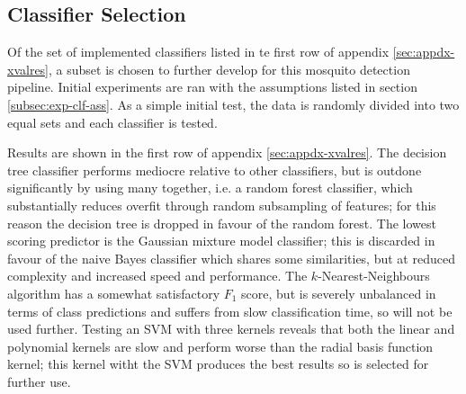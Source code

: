       
     
    \subsection{Classifier Selection}
    \label{subsec:exp-clf-select}
        Of the set of implemented classifiers listed in te first row of appendix \ref{sec:appdx-xvalres}, a subset is chosen to further develop for this mosquito detection pipeline. Initial experiments are ran with the assumptions listed in section \ref{subsec:exp-clf-ass}. As a simple initial test, the data is randomly divided into two equal sets and each classifier is tested.
        
        Results are shown in the first row of appendix \ref{sec:appdx-xvalres}. The decision tree classifier performs mediocre relative to other classifiers, but is outdone significantly by using many together, i.e. a random forest classifier, which substantially reduces overfit through random subsampling of features; for this reason the decision tree is dropped in favour of the random forest. The lowest scoring predictor is the Gaussian mixture model classifier; this is discarded in favour of the naive Bayes classifier which shares some similarities, but at reduced complexity and increased speed and performance. The $k$-Nearest-Neighbours algorithm has a somewhat satisfactory $F_1$ score, but is severely unbalanced in terms of class predictions and suffers from slow classification time, so will not be used further. Testing an SVM with three kernels reveals that both the linear and polynomial kernels are slow and perform worse than the radial basis function kernel; this kernel witht the SVM produces the best results so is selected for further use.
        
       
